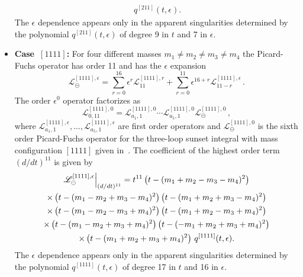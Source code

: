 \documentclass[a4paper,12pt]{article}
\numberwithin{equation}{section}
\numberwithin{figure}{section}
\def\su{\circleddash}
\begin{document}
\begin{itemize}
\begin{multline}
                   \, q^{[211]}(t,\epsilon).
                 \end{multline}
                 The $\epsilon$ dependence appears only in the
                 apparent singularities determined by the polynomial
                 $q^{[211]}(t,\epsilon)$ of degree 9 in $t$  and 7 in $\epsilon$.
  \item   {\bf Case~$[1111]$:} For four different masses $m_1\neq m_2\neq m_3 \neq m_4$ the
  Picard-Fuchs operator has order 11 and has the $\epsilon$ expansion 
  \begin{equation}
    \mathscr{L}_\su^{[1111],\epsilon}=     \sum_{r=0}^{16}\epsilon^r
    \mathscr{L}^{[1111],r}_{11}+\sum_{r=0}^{11} \epsilon^{16+r}  \mathscr{L}^{[1111],\epsilon}_{11-r}\, .
  \end{equation}
    The order $\epsilon^0$ operator factorizes as
  \begin{equation}
         \mathscr{L}^{[1111],0}_{0,11}=   \mathscr{L}^{[1111],0}_{a_1,1}  \cdots  \mathscr{L}^{[1111],0}_{a_5,1}   \mathscr{L}^{[1111],0}_{\su}\,,
       \end{equation}
        where  $ \mathscr{L}^{[1111],\epsilon}_{a_1,1},\dots,  \mathscr{L}^{[1111],\epsilon}_{a_5,1}$ are  first order operators
       and $\mathscr{L}^{[1111],0}_{\su}$ is the sixth  order  Picard-Fuchs operator for the
       three-loop sunset integral with mass configuration $[1111]$
       given in~\cite{Lairez:2022zkj}.
        The coefficient of the highest order term $(d/dt)^{11}$    is given by
       \begin{multline}
                   \mathscr{L}^{[1111],\epsilon}_\su\Big\vert_{(d/dt)^{11}}=
                   t^{11}\left(t-(m_{1}+m_{2}-m_{3}-m_{4})^2\right) \cr\times
   \left(t-(m_{1}-m_{2}+m_{3}-m_{4})^2\right)
   \left(t-(m_{1}+m_{2}+m_{3}-m_{4})^2\right) \cr\times
   \left(t-(m_{1}-m_{2}-m_{3}+m_{4})^2\right)
   \left(t-(m_{1}+m_{2}-m_{3}+m_{4})^2\right)\cr\times
   \left(t-(m_{1}-m_{2}+m_{3}+m_{4})^2\right)
   \left(t-(-m_{1}+m_{2}+m_{3}+m_{4})^2\right) \cr\times
   \left(t-(m_{1}+m_{2}+m_{3}+m_{4})^2\right)
                   \, q^{[1111]}(t,\epsilon).
                 \end{multline}
                 The $\epsilon$ dependence appears only in the
                 apparent singularities determined by the polynomial
                 $q^{[1111]}(t,\epsilon)$ of degree 17 in
                 $t$ and 16 in $\epsilon$.
     \end{itemize}
\end{document}
